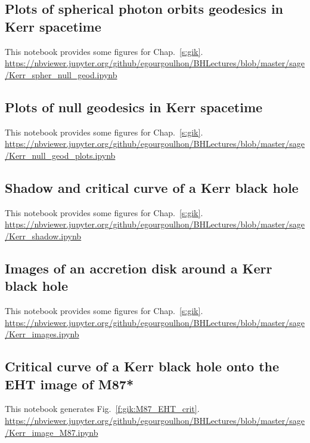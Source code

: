 \subsection{Plots of spherical photon orbits geodesics in Kerr spacetime}
\label{s:sam:Kerr_spher_null_geod}

This notebook provides some figures for Chap.~\ref{s:gik}.\\[1ex]
{\footnotesize
\url{https://nbviewer.jupyter.org/github/egourgoulhon/BHLectures/blob/master/sage/Kerr_spher_null_geod.ipynb}
}

\subsection{Plots of null geodesics in Kerr spacetime} \label{s:sam:Kerr_null_geod_plots}

This notebook provides some figures for Chap.~\ref{s:gik}.\\[1ex]
{\footnotesize
\url{https://nbviewer.jupyter.org/github/egourgoulhon/BHLectures/blob/master/sage/Kerr_null_geod_plots.ipynb}
}

\subsection{Shadow and critical curve of a Kerr black hole} \label{s:sam:Kerr_shadow}

This notebook provides some figures for Chap.~\ref{s:gik}.\\[1ex]
{\footnotesize
\url{https://nbviewer.jupyter.org/github/egourgoulhon/BHLectures/blob/master/sage/Kerr_shadow.ipynb}
}

\subsection{Images of an accretion disk around a Kerr black hole} \label{s:sam:Kerr_images}

This notebook provides some figures for Chap.~\ref{s:gik}.\\[1ex]
{\footnotesize
\url{https://nbviewer.jupyter.org/github/egourgoulhon/BHLectures/blob/master/sage/Kerr_images.ipynb}
}

\subsection{Critical curve of a Kerr black hole onto the EHT image of M87*} \label{s:sam:Kerr_image_M87}

This notebook generates Fig.~\ref{f:gik:M87_EHT_crit}.\\[1ex]
{\footnotesize
\url{https://nbviewer.jupyter.org/github/egourgoulhon/BHLectures/blob/master/sage/Kerr_image_M87.ipynb}
}


